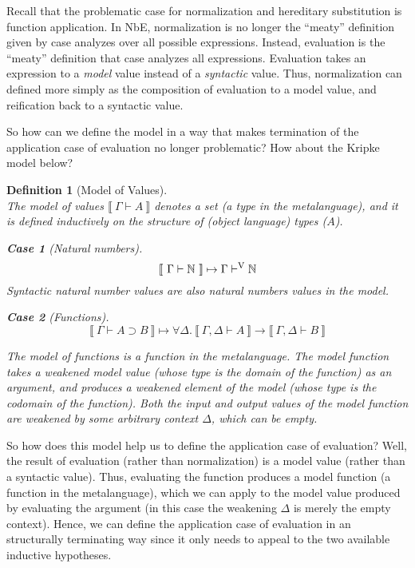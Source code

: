\documentclass{llncs}
\newtheorem{defin}{Definition}
\newtheorem{subdefin}{Case}
\def\dfn{\mapsto}
\def\arr{\supset}
\def\marr{\rightarrow}
\def\nat{\mathbb{N}}
\newcommand{\turn}[1]{\vdash^\con{#1}}
\newcommand{\all}[1]{\forall#1.~}
\newcommand{\el}[1]{\llbracket ~ #1 ~ \rrbracket}
\newcommand{\con}[1]{\textmd{#1}}
\newcommand{\typm}[1]{\el{\Gamma \vdash #1}}
\newcommand{\gdtypm}[1]{\el{\Gamma, \Delta \vdash #1}}
\newcommand{\typv}[1]{\Gamma \turn{V} #1}
\begin{document}
Recall that the problematic case for normalization and hereditary
substitution is function application. In NbE, normalization is no
longer the ``meaty'' definition given by case analyzes over all
possible expressions. Instead, evaluation is the ``meaty'' definition
that case analyzes all expressions. Evaluation takes an expression
to a \textit{model} value instead of a \textit{syntactic} value.
Thus, normalization can defined more simply as the composition of
evaluation to a model value, and reification back to a syntactic value.

So how can we define the model in a way that makes termination of the
application case of evaluation no longer problematic? How about the
Kripke model below?

\begin{defin}[Model of Values]
\label{def:mval}
$ $\\
The model of values $\typm{A}$ denotes a set (a type in the
metalanguage), and it is defined inductively on the structure
of (object language) types ($A$).

\begin{subdefin}[Natural numbers]
$$
\typm{\nat} \dfn \typv{\nat}
$$
Syntactic natural number values are also natural numbers values in the
model.
\end{subdefin}

\begin{subdefin}[Functions]
$$
\typm{A \arr B} \dfn \all{\Delta} \gdtypm{A} \marr \gdtypm{B}
$$

The model of functions is a function in the metalanguage.
The model function takes a weakened model value (whose type is
the domain of the function) as an argument, and produces a
weakened element of the model (whose type is the codomain of the
function). Both the input and output values of the model function are
weakened by some arbitrary context $\Delta$, which can be empty.
\end{subdefin}

\end{defin}

So how does this model help us to define the application case of
evaluation? Well, the result of evaluation (rather than
normalization) is a model value (rather than a syntactic value).
Thus, evaluating the function produces a model
function (a function in the metalanguage), which we can apply to the model value produced by evaluating
the argument (in this case the weakening $\Delta$ is merely the empty
context). Hence, we can define the application case of evaluation in
an structurally terminating way since it only needs to appeal to the
two available inductive hypotheses.
\end{document}
